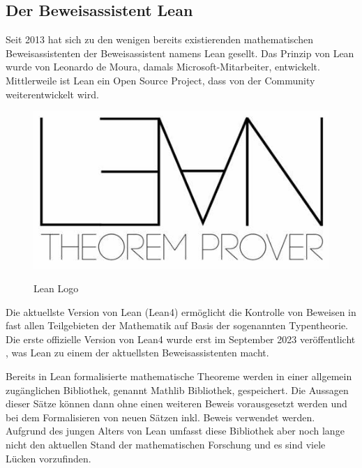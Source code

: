 \documentclass[10pt]{article}
\begin{document}
\subsection{Der Beweisassistent Lean}
Seit 2013 hat sich zu den wenigen bereits existierenden mathematischen Beweisassistenten der Beweisassistent namens Lean gesellt. Das Prinzip von Lean wurde von Leonardo de Moura, damals Microsoft-Mitarbeiter, entwickelt. Mittlerweile ist Lean ein Open Source Project, dass von der Community weiterentwickelt wird.\par

\begin{minipage}{6cm}
\begin{figure}[H]
    \centering
    \includegraphics[scale=0.20]{Lean Logo.jpg}
    \label{Abb1}
    \caption{Lean Logo \cite{Q12}}
    
\end{figure}
\end{minipage}
\begin{minipage}{10cm}
Die aktuellste Version von Lean (Lean4) ermöglicht die Kontrolle von Beweisen in fast allen Teilgebieten der Mathematik auf Basis der sogenannten Typentheorie. Die erste offizielle Version von Lean4 wurde erst im September 2023 veröffentlicht \cite{Q2}, was Lean zu einem der aktuellsten Beweisassistenten macht.
\end{minipage}

\noindent Bereits in Lean formalisierte mathematische Theoreme werden in einer allgemein zugänglichen Bibliothek, genannt Mathlib Bibliothek, gespeichert. Die Aussagen dieser Sätze können dann ohne einen weiteren Beweis vorausgesetzt werden und bei dem Formalisieren von neuen Sätzen inkl. Beweis verwendet werden. Aufgrund des jungen Alters von Lean umfasst diese Bibliothek aber noch lange nicht den aktuellen Stand der mathematischen Forschung und es sind viele Lücken vorzufinden. \cite{Q8}\par
\end{document}
